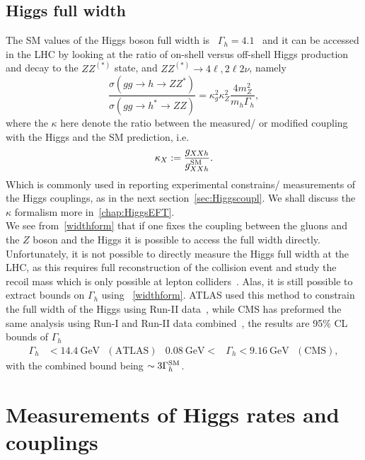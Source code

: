 \subsection{Higgs full width}
The SM values of the Higgs boson full width is ~$\Gamma_h=4.1$ \GeV\, and it can be accessed in the LHC by looking at the ratio of on-shell versus off-shell Higgs production and decay to the $ZZ^{(*)}$ state, and $ZZ^{(*)}\to 4 \ell, 2 \ell 2 \nu$, namely
\begin{equation}
\frac{\sigma(gg \to h\to Z Z^*)}{\sigma(gg \to h^*\to Z Z)} = \kappa_g^2 \kappa_Z^2 \frac{4 m_Z^2}{m_h \Gamma_h},
\label{widthform}
\end{equation}
where the $\kappa$ here denote the ratio between the measured/ or modified coupling with the Higgs and the SM prediction, i.e.
\begin{equation}
\kappa_X := \frac{g_{XX h}}{g_{XXh}^{\mathrm{SM}}}.
\label{kappa}
\end{equation}
Which is commonly used in reporting experimental constrains/ measurements of the Higgs couplings, as in the next section~\autoref{sec:Higgscoupl}. We shall discuss the $\kappa$ formalism more in~\autoref{chap:HiggsEFT}. \\ We see from~\eqref{widthform} that if one fixes the coupling between the gluons and the $Z$ boson and the Higgs it is possible to access the full width directly.  Unfortunately, it is not possible to directly measure the Higgs full width at the LHC, as this requires full reconstruction of the collision event and study the recoil mass which is only possible at lepton colliders~\cite{DeBlas:2019qco,Banerjee:2021huv}. 
Alas, it is still possible to extract bounds on $\Gamma_h$ using ~\eqref{widthform}. ATLAS used this method to constrain the full width of the Higgs using Run-II data~\cite{ATLAS:2018jym}, while CMS has preformed the same analysis using Run-I and Run-II data combined~\cite{CMS:2019ekd}, the results are 95\% CL bounds of $\Gamma_h$
\begin{align}
\Gamma_h &< \SI{14.4}{\giga\electronvolt} \,\,\,\, (\text{ATLAS}) & \SI{0.08}{\giga\electronvolt} <&\Gamma_h < \SI{9.16}{\giga\electronvolt}  \,\,\,\, (\text{CMS}),
\end{align}
with the combined bound being  $\sim 3 \Gamma_h^{\mathrm{SM}}$. 
\section{Measurements of Higgs rates and couplings \label{sec:Higgscoupl} }

